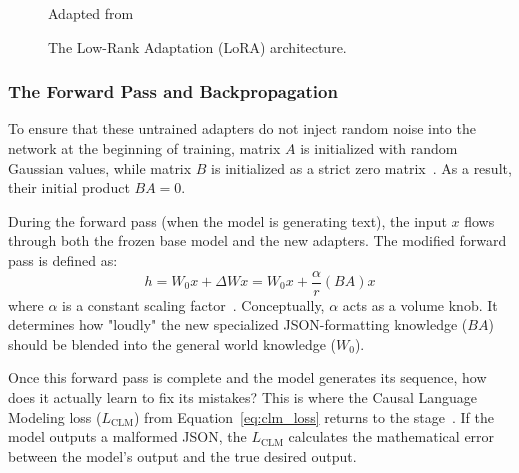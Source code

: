 \begin{figure}[H]
\vspace{1ex}
{\raggedleft \footnotesize Adapted from \parencite{Hu_Shen_Wallis_Allen-Zhu_Li_Wang_Wang_Chen_2021} \par}
\caption{The Low-Rank Adaptation (LoRA) architecture.}
\label{fig:lora_architecture}
\end{figure}

\subsubsection{The Forward Pass and Backpropagation}

To ensure that these untrained adapters do not inject random noise into the network at the beginning of training, matrix $A$ is initialized with random Gaussian values, while matrix $B$ is initialized as a strict zero matrix~\parencite{Hu_Shen_Wallis_Allen-Zhu_Li_Wang_Wang_Chen_2021}. As a result, their initial product $BA = 0$. 

During the forward pass (when the model is generating text), the input $x$ flows through both the frozen base model and the new adapters. The modified forward pass is defined as:
\begin{equation}
\label{eq:lora_forward}
    h = W_0 x + \Delta W x = W_0 x + \frac{\alpha}{r} (B A) x
\end{equation}
where $\alpha$ is a constant scaling factor~\parencite{Hu_Shen_Wallis_Allen-Zhu_Li_Wang_Wang_Chen_2021, Dettmers_Pagnoni_Holtzman_Zettlemoyer_2023}. Conceptually, $\alpha$ acts as a volume knob. It determines how "loudly" the new specialized JSON-formatting knowledge ($BA$) should be blended into the general world knowledge ($W_0$). 

Once this forward pass is complete and the model generates its sequence, how does it actually learn to fix its mistakes? This is where the Causal Language Modeling loss ($L_{\text{CLM}}$) from Equation~\ref{eq:clm_loss} returns to the stage~\parencite{Dettmers_Pagnoni_Holtzman_Zettlemoyer_2023}. If the model outputs a malformed JSON, the $L_{\text{CLM}}$ calculates the mathematical error between the model's output and the true desired output. 

